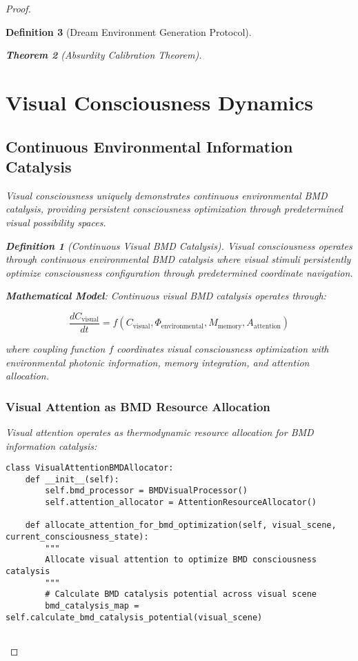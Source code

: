 \documentclass[12pt,a4paper]{article}
\newtheorem{theorem}{Theorem}[section]
\newtheorem{definition}[theorem]{Definition}
\begin{document}
\begin{proof}
\begin{definition}[Dream Environment Generation Protocol]
\begin{theorem}[Absurdity Calibration Theorem]
\section{Visual Consciousness Dynamics}

\subsection{Continuous Environmental Information Catalysis}

Visual consciousness uniquely demonstrates continuous environmental BMD catalysis, providing persistent consciousness optimization through predetermined visual possibility spaces.

\begin{definition}[Continuous Visual BMD Catalysis]
Visual consciousness operates through continuous environmental BMD catalysis where visual stimuli persistently optimize consciousness configuration through predetermined coordinate navigation.
\end{definition}

\textbf{Mathematical Model}:
Continuous visual BMD catalysis operates through:

$$\frac{dC_{\text{visual}}}{dt} = f(C_{\text{visual}}, \Phi_{\text{environmental}}, M_{\text{memory}}, A_{\text{attention}})$$

where coupling function $f$ coordinates visual consciousness optimization with environmental photonic information, memory integration, and attention allocation.

\subsubsection{Visual Attention as BMD Resource Allocation}

Visual attention operates as thermodynamic resource allocation for BMD information catalysis:

\begin{lstlisting}[style=pythonstyle, caption=Visual Attention BMD Resource Allocation]
class VisualAttentionBMDAllocator:
    def __init__(self):
        self.bmd_processor = BMDVisualProcessor()
        self.attention_allocator = AttentionResourceAllocator()
        
    def allocate_attention_for_bmd_optimization(self, visual_scene, current_consciousness_state):
        """
        Allocate visual attention to optimize BMD consciousness catalysis
        """
        # Calculate BMD catalysis potential across visual scene
        bmd_catalysis_map = self.calculate_bmd_catalysis_potential(visual_scene)
        

\end{lstlisting}
\end{theorem}
\end{definition}
\end{proof}
\end{document}
